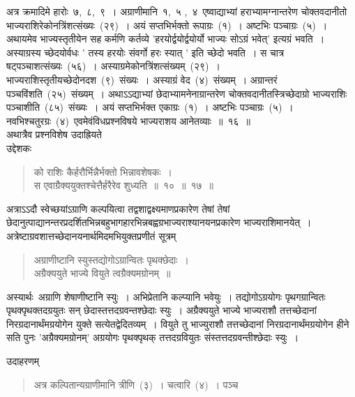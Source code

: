 \documentclass[11pt, openany]{book}
\begin{document}
\indent
अत्र क्रमादिमे हारोः~७,~८,~९~। अग्राणीमानि~१,~५ ,~४~एष्वाद्याभ्यां हराभ्यामग्नान्तरेण चोक्तवदानीतो भाज्यराशिरेकोनत्रिंशत्संख्यः~(२९)~। अयं सप्तभिर्भक्तो रूपाग्रः~(१)~। अष्टभिः पञ्चाग्रः~(५)~। अथायमेव भाज्यस्तृतीयेन सह कर्मणि कर्तव्ये 'हरयोर्द्वयोर्द्वयोर्यो भाज्यः सोऽग्रं भवेत्' इत्यग्रं भवति~। अस्याग्रस्य च्छेदयोर्वधः ' तस्य हरयोः संवर्गो हरः स्यात् ' इति च्छेदो भवति~। स चात्र षट्पञ्चाशत्संख्यः~(५६)~। अस्याग्रमेकोनत्रिंशत्संख्यम्~(२९)~। भाज्यराशिस्तृतीयच्छेदोनदश~(९)~संख्यः~। अस्याग्रं वेद~(४)~संख्यम्~। अग्रान्तरं पञ्चविंशति~(२५)~संख्यम्~। अथाऽऽद्याभ्यां छेदाभ्यामनेनाग्रान्तरेण चोक्तवदानीतस्त्रिच्छेदाग्रो भाज्यराशिः पञ्चाशीति~(८५)~संख्यः~। अयं सप्तभिर्भक्त एकाग्रः~(१)~। अष्टभिः पञ्चाग्रः~(५)~। नवभिश्चतुरग्रः~(४)~एवमेवंविधप्रश्नविषये भाज्यराशय आनेतव्याः~॥~१६~॥\\
\indent
अथात्रैव प्रश्नविशेष उदाह्रियते \textendash\\
उद्देशकः\textendash
\begin{quote}
{\ku को राशिः कैर्हरौर्भिन्नैर्भक्तो भिन्नावशेषकः~।\\
स एवाग्रैक्ययुक्तश्चेत्तैर्हरैरेव शुध्यति~॥~१०~॥~१७~॥ }
\end{quote}
\indent
अत्राऽऽदौ स्वेच्छयांऽग्राणि कल्पयित्वा तद्वशाद्वक्ष्यमाणप्रकारेण तेषां तेषां छेदानुत्पाद्यानन्तरप्रदर्शितभिन्नबहुभागहारभिन्नबह्वग्रभाज्यराश्यानयनप्रकारेण भाज्यराशिमानयेत्~।\\
\indent
अत्रेष्टाग्रवशात्तच्छेदानयनार्थमिदमभियुक्तप्रणीतं सूत्रम्\textendash\\
\hspace{1cm}\begin{quote}
{\qt
अग्राणीष्टानि स्युस्तद्योगोऽग्रान्वितः पृथक्छेदाः~।\\
अग्रैक्ययुते भाज्ये वियुते त्वग्रैक्यमग्रोनम्~॥}
\end{quote}
\indent
अस्यार्थः\textendash\ अग्राणि शेषाणीष्टानि स्युः~। अभिप्रेतानि कल्प्यानि भवेयुः~। तद्योगोऽग्रयोगः पृथगग्रान्वितः पृथक्पृथक्तदग्रयुतः सन् छेदास्तत्तदग्रवन्तश्छेदाः स्युः~। अग्रैक्ययुते भाज्ये भाज्यराशौ तत्तच्छेदानां निरग्रदानार्थंमग्रयोगेन युक्ते सत्येतद्वेदितव्यम्~। वियुते तु भाज्युराशौ तत्तच्छेदानां निरग्रदानार्थंमग्रयोगेन हीने सति पुनः 'अग्रैक्यमग्रोनम्' अग्रयोगः पृथक्पृथक् तत्तदग्रवियुतः संस्तत्तदग्रवन्तीश्छेदाः स्युः~।

\indent
उदाहरणम्\textendash
\indent\begin{quote}
{\ku
अत्र कल्पितान्यग्राणीमानि त्रीणि~(३)~। चत्वारि~(४)~। पञ्च }\
\end{quote}
\end{document}
